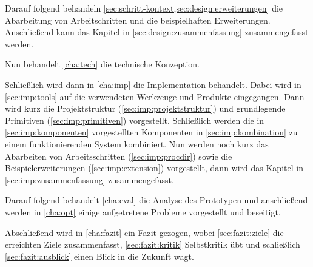 Darauf folgend behandeln \cref{sec:schritt-kontext,sec:design:erweiterungen} die Abarbeitung von Arbeitschritten und die beispielhaften Erweiterungen.
Anschließend kann das Kapitel in \cref{sec:design:zusammenfassung} zusammengefasst werden.

Nun behandelt \cref{cha:tech} die technische Konzeption.


Schließlich wird dann in \cref{cha:imp} die Implementation behandelt.
Dabei wird in \cref{sec:imp:tools} auf die verwendeten Werkzeuge und Produkte eingegangen. Dann wird kurz die Projektstruktur (\cref{sec:imp:projektstruktur}) und grundlegende Primitiven (\cref{sec:imp:primitiven}) vorgestellt.
Schließlich werden die in \cref{sec:imp:komponenten} vorgestellten Komponenten in \cref{sec:imp:kombination} zu einem funktionierenden System kombiniert.
Nun werden noch kurz das Abarbeiten von Arbeitsschritten (\cref{sec:imp:procdir}) sowie die Beispielerweiterungen (\cref{sec:imp:extension}) vorgestellt,
dann wird das Kapitel in \cref{sec:imp:zusammenfassung} zusammengefasst.

Darauf folgend behandelt \cref{cha:eval} die Analyse des Prototypen und anschließend werden in \cref{cha:opt} einige aufgetretene Probleme vorgestellt und beseitigt.

Abschließend wird in \cref{cha:fazit} ein Fazit gezogen,
wobei \cref{sec:fazit:ziele} die erreichten Ziele zusammenfasst,
\cref{sec:fazit:kritik} Selbstkritik übt und schließlich \cref{sec:fazit:ausblick} einen Blick in die Zukunft wagt.

